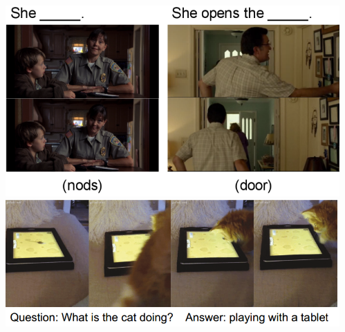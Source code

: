 \begin{frame}
\begin{columns}            
\begin{column}{0.6\textwidth}
\vspace{0.2in}
\begin{overlayarea}{\textwidth}{\textheight}
                \includegraphics[scale=0.25]{images/fill-in-blank.png}\\
                \includegraphics[scale=0.3]{images/open-end-video-QA.png}\\
\end{overlayarea}
\end{column}

\begin{column}{0.4\textwidth}
\begin{overlayarea}{\textwidth}{\textheight}


\end{overlayarea}
\end{column}
\end{columns}
\end{frame}
